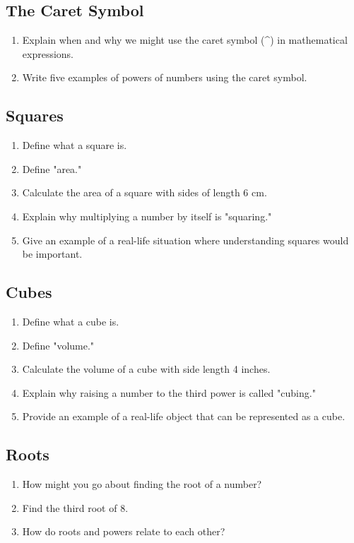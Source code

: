 \documentclass[12pt]{article}
\begin{document}
\begin{enumerate}
\subsection*{The Caret Symbol}
\begin{enumerate}
\item Explain when and why we might use the caret symbol (\textasciicircum) in mathematical expressions.
\item Write five examples of powers of numbers using the caret symbol.
\end{enumerate}

\subsection*{Squares}
\begin{enumerate}
\item Define what a square is.
\item Define "area."
\item Calculate the area of a square with sides of length 6 cm.
\item Explain why multiplying a number by itself is "squaring."
\item Give an example of a real-life situation where understanding squares would be important.
\end{enumerate}

\subsection*{Cubes}
\begin{enumerate}
\item Define what a cube is.
\item Define "volume."
\item Calculate the volume of a cube with side length 4 inches.
\item Explain why raising a number to the third power is called "cubing."
\item Provide an example of a real-life object that can be represented as a cube.
\end{enumerate}

\subsection*{Roots}

\begin{enumerate}
\item How might you go about finding the root of a number?
\item Find the third root of 8.
\item How do roots and powers relate to each other?
\end{enumerate}


\end{enumerate}
\end{document}
